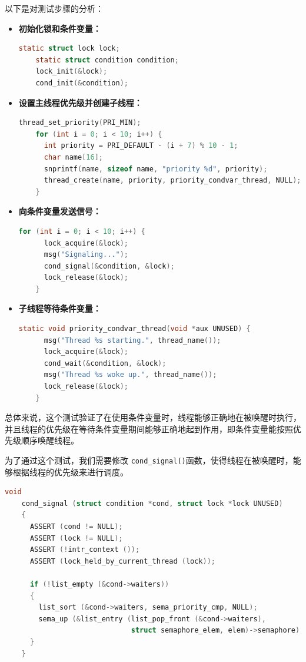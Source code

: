 \documentclass{article}
\begin{document}
以下是对测试步骤的分析：

\begin{itemize}
  \item \textbf{初始化锁和条件变量：}
        \begin{lstlisting}[language=C]
    static struct lock lock;
    static struct condition condition;
    lock_init(&lock);
    cond_init(&condition);
\end{lstlisting}

  \item \textbf{设置主线程优先级并创建子线程：}
        \begin{lstlisting}[language=C]
    thread_set_priority(PRI_MIN);
    for (int i = 0; i < 10; i++) {
      int priority = PRI_DEFAULT - (i + 7) % 10 - 1;
      char name[16];
      snprintf(name, sizeof name, "priority %d", priority);
      thread_create(name, priority, priority_condvar_thread, NULL);
    }
\end{lstlisting}

  \item \textbf{向条件变量发送信号：}
        \begin{lstlisting}[language=C]
    for (int i = 0; i < 10; i++) {
      lock_acquire(&lock);
      msg("Signaling...");
      cond_signal(&condition, &lock);
      lock_release(&lock);
    }
\end{lstlisting}

  \item \textbf{子线程等待条件变量：}
        \begin{lstlisting}[language=C]
    static void priority_condvar_thread(void *aux UNUSED) {
      msg("Thread %s starting.", thread_name());
      lock_acquire(&lock);
      cond_wait(&condition, &lock);
      msg("Thread %s woke up.", thread_name());
      lock_release(&lock);
    }
\end{lstlisting}
\end{itemize}

总体来说，这个测试验证了在使用条件变量时，线程能够正确地在被唤醒时执行，并且线程的优先级在等待条件变量期间能够正确地起到作用，即条件变量能按照优先级顺序唤醒线程。

为了通过这个测试，我们需要修改 \texttt{cond\_signal()}函数，使得线程在被唤醒时，能够根据线程的优先级来进行调度。

\begin{lstlisting}[language=C, title=修改后的\texttt{cond\_signal()}函数]
    void
    cond_signal (struct condition *cond, struct lock *lock UNUSED) 
    {
      ASSERT (cond != NULL);
      ASSERT (lock != NULL);
      ASSERT (!intr_context ());
      ASSERT (lock_held_by_current_thread (lock));
    
      if (!list_empty (&cond->waiters)) 
      {
        list_sort (&cond->waiters, sema_priority_cmp, NULL);
        sema_up (&list_entry (list_pop_front (&cond->waiters),
                              struct semaphore_elem, elem)->semaphore);
      }
    }
\end{lstlisting}
\end{document}
